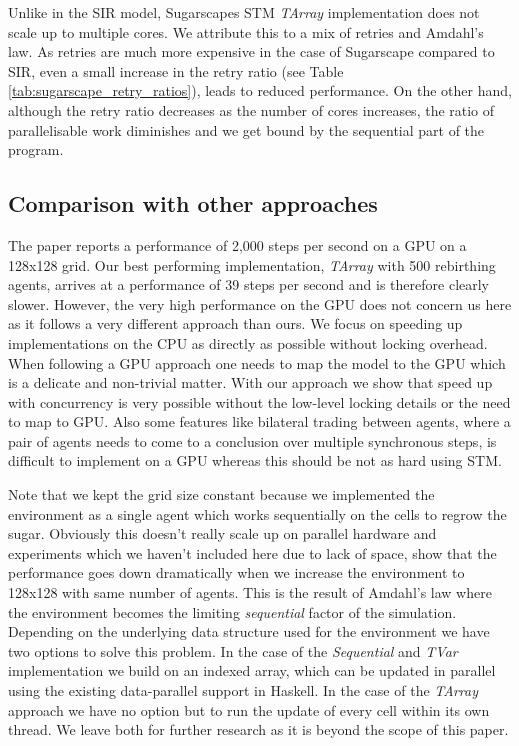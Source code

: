 Unlike in the SIR model, Sugarscapes STM \textit{TArray} implementation does not scale up to multiple cores. We attribute this to a mix of retries and Amdahl's law. As retries are much more expensive in the case of Sugarscape compared to SIR, even a small increase in the retry ratio (see Table \ref{tab:sugarscape_retry_ratios}), leads to reduced performance. On the other hand, although the retry ratio decreases as the number of cores increases, the ratio of parallelisable work diminishes and we get bound by the sequential part of the program.

\subsection{Comparison with other approaches}
The paper \cite{lysenko_framework_2008} reports a performance of 2,000 steps per second on a GPU on a 128x128 grid. Our best performing implementation, \textit{TArray} with 500 rebirthing agents, arrives at a performance of 39 steps per second and is therefore clearly slower. However, the very high performance on the GPU does not concern us here as it follows a very different approach than ours. We focus on speeding up implementations on the CPU as directly as possible without locking overhead. When following a GPU approach one needs to map the model to the GPU which is a delicate and non-trivial matter. With our approach we show that speed up with concurrency is very possible without the low-level locking details or the need to map to GPU. Also some features like bilateral trading between agents, where a pair of agents needs to come to a conclusion over multiple synchronous steps, is difficult to implement on a GPU whereas this should be not as hard using STM.

Note that we kept the grid size constant because we implemented the environment as a single agent which works sequentially on the cells to regrow the sugar. Obviously this doesn't really scale up on parallel hardware and experiments which we haven't included here due to lack of space, show that the performance goes down dramatically when we increase the environment to 128x128 with same number of agents. This is the result of Amdahl's law where the environment becomes the limiting \textit{sequential} factor of the simulation. Depending on the underlying data structure used for the environment we have two options to solve this problem. In the case of the \textit{Sequential} and \textit{TVar} implementation we build on an indexed array, which can be updated in parallel using the existing data-parallel support in Haskell. In the case of the \textit{TArray} approach we have no option but to run the update of every cell within its own thread. We leave both for further research as it is beyond the scope of this paper.

